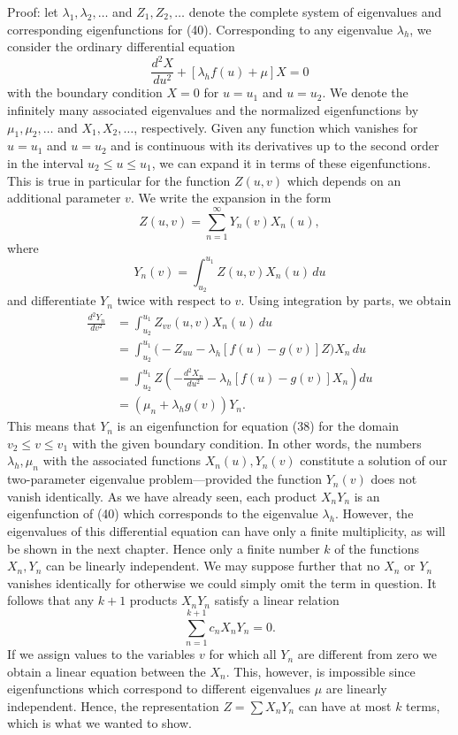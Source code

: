 Proof: let $\lambda_1,\lambda_2,\ldots$ and $Z_1,Z_2,\ldots$ denote the complete system of eigenvalues and corresponding eigenfunctions for (40). Corresponding to any eigenvalue $\lambda_h$, we consider the ordinary differential equation
\[
\frac{d^2X}{du^2}+[\lambda_hf(u)+\mu]X=0
\]
with the boundary condition $X=0$ for $u=u_1$ and $u=u_2$. We denote the infinitely many associated eigenvalues and the normalized eigenfunctions by $\mu_1,\mu_2,\ldots$ and $X_1,X_2,\ldots$, respectively. Given any function which vanishes for $u=u_1$ and $u=u_2$ and is continuous with its derivatives up to the second order in the interval $u_2\le u\le u_1$, we can expand it in terms of these eigenfunctions. This is true in particular for the function $Z(u,v)$ which depends on an additional parameter $v$. We write the expansion in the form
\[
Z(u,v)=\sum_{n=1}^{\infty}Y_n(v)X_n(u),
\]
where
\[
Y_n(v)=\int_{u_2}^{u_1}Z(u,v)X_n(u)\,du
\]
and differentiate $Y_n$ twice with respect to $v$. Using integration by parts, we obtain
\[
\begin{aligned}
\frac{d^2Y_n}{dv^2}
&=\int_{u_2}^{u_1}Z_{vv}(u,v)X_n(u)\,du\\
&=\int_{u_2}^{u_1}\bigl(-Z_{uu}-\lambda_h[f(u)-g(v)]Z\bigr)X_n\,du\\
&=\int_{u_2}^{u_1}Z\left(-\frac{d^2X_n}{du^2}-\lambda_h[f(u)-g(v)]X_n\right)du\\
&=(\mu_n+\lambda_hg(v))Y_n.
\end{aligned}
\]
This means that $Y_n$ is an eigenfunction for equation (38) for the domain $v_2\le v\le v_1$ with the given boundary condition. In other words, the numbers $\lambda_h,\mu_n$ with the associated functions $X_n(u),Y_n(v)$ constitute a solution of our two-parameter eigenvalue problem---provided the function $Y_n(v)$ does not vanish identically. As we have already seen, each product $X_nY_n$ is an eigenfunction of (40) which corresponds to the eigenvalue $\lambda_h$. However, the eigenvalues of this differential equation can have only a finite multiplicity, as will be shown in the next chapter. Hence only a finite number $k$ of the functions $X_n,Y_n$ can be linearly independent. We may suppose further that no $X_n$ or $Y_n$ vanishes identically for otherwise we could simply omit the term in question. It follows that any $k+1$ products $X_nY_n$ satisfy a linear relation
\[
\sum_{n=1}^{k+1}c_nX_nY_n=0.
\]
If we assign values to the variables $v$ for which all $Y_n$ are different from zero we obtain a linear equation between the $X_n$. This, however, is impossible since eigenfunctions which correspond to different eigenvalues $\mu$ are linearly independent. Hence, the representation $Z=\sum X_nY_n$ can have at most $k$ terms, which is what we wanted to show.

